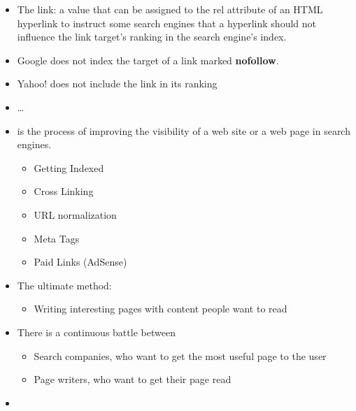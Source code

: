 \documentclass[a4paper,landscape,headrule,footrule,xetex]{foils}
\begin{document}
\begin{itemize}
\item The  link: a value that can be assigned to the rel
attribute of an HTML hyperlink to instruct some search engines that a
hyperlink should not influence the link target's ranking in the search
engine's index.
\item Google does not index the target of a link marked \textbf{nofollow}.
\item Yahoo! does not include the link in its ranking
\item \ldots
\end{itemize}





\begin{itemize}
\item {} is the process of
  improving the visibility of a web site or a web page in search
  engines.
  \begin{itemize}
  \item Getting Indexed
  \item Cross Linking
  \item URL normalization
  \item Meta Tags
  \item Paid Links (AdSense)
  \end{itemize}
\item The ultimate method:
  \begin{itemize}
  \item Writing interesting pages with content people want to read 
  \end{itemize}
\end{itemize}


\begin{itemize}
\item There is a continuous battle between 
  \begin{itemize}
  \item Search companies, who want to get the most useful page to the user
  \item Page writers, who want to get their page read
  \end{itemize}
\item {}
\end{itemize}
\end{document}
